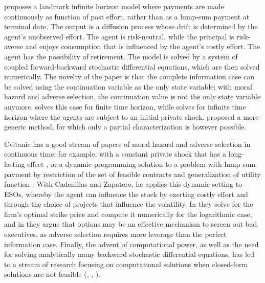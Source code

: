     \citet{sannikov2008continuous} proposes a landmark infinite horizon model where payments are made continuously as function of past effort, rather than as a lump-sum payment at terminal date. The output is a diffusion process whose drift is determined by the agent's unobserved effort. The agent is risk-neutral, while the principal is risk-averse and enjoys consumption that is influenced by the agent's costly effort. The agent has the possibility of retirement. The model is solved by a system of coupled forward-backward stochastic differential equations, which are then solved numerically.
    The novelty of the paper is that the complete information case can be solved using the continuation variable as the only state variable; with moral hazard and adverse selection, the continuation value is not the only state variable anymore. \citet{sannikov2008continuous} solves this case for finite time horizon, while \citet{cvitanic2013dynamics} solves for infinite time horizon where the agents are subject to an initial private shock. \citet{williams2009dynamic} proposed a more generic method, for which only a partial characterization is however possible. 

    Cvitanic has a good stream of papers of moral hazard and adverse selection in continuous time: for example, with a constant private shock that has a long-lasting effect \citep{cvitanic2013dynamics}, or a dynamic programming solution to a problem with lump sum payment by restriction of the set of feasible contracts and generalization of utility function \citep{cvitanic2018dynamic}. With Cadenillas and Zapatero, he applies this dynamic setting to ESOs, whereby the agent can influence the stock by exerting costly effort and through the choice of projects that influence the volatility. In \citet{cadenillas2002executive} they solve for the firm's optimal strike price and compute it numerically for the logarithmic case, and in \citet{cadenillas2005executive} they argue that options may be an effective mechanism to screen out bad executives, as adverse selection requires more leverage than the perfect information case.
    Finally, the advent of computational power, as well as the need for solving analytically many backward stochastic differential equations, has led to a stream of research focusing on computational solutions when closed-form solutions are not feasible (\citet{azar2018computational}, \citet{dutting2021complexity}, \citet{dutting2023multi}). 